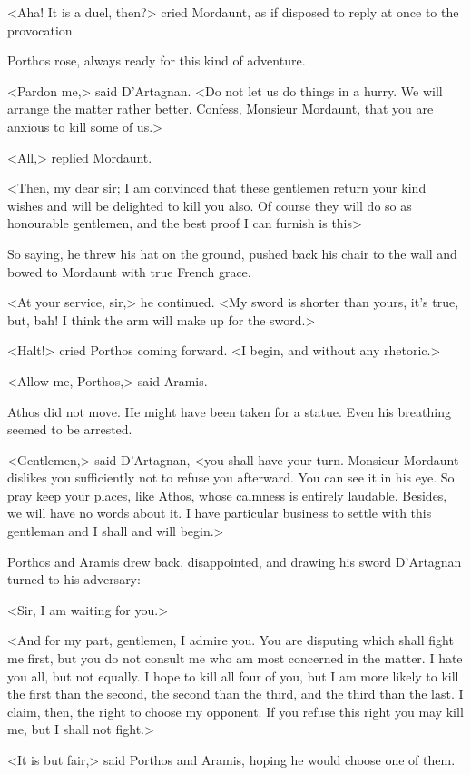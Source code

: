 <Aha! It is a duel, then?> cried Mordaunt, as if disposed to reply at once to the provocation.

Porthos rose, always ready for this kind of adventure.

<Pardon me,> said D'Artagnan. <Do not let us do things in a hurry. We will arrange the matter rather better. Confess, Monsieur Mordaunt, that you are anxious to kill some of us.>

<All,> replied Mordaunt.

<Then, my dear sir; I am convinced that these gentlemen return your kind wishes and will be delighted to kill you also. Of course they will do so as honourable gentlemen, and the best proof I can furnish is this\longdash>

So saying, he threw his hat on the ground, pushed back his chair to the wall and bowed to Mordaunt with true French grace.

<At your service, sir,> he continued. <My sword is shorter than yours, it's true, but, bah! I think the arm will make up for the sword.>

<Halt!> cried Porthos coming forward. <I begin, and without any rhetoric.>

<Allow me, Porthos,> said Aramis.

Athos did not move. He might have been taken for a statue. Even his breathing seemed to be arrested.

<Gentlemen,> said D'Artagnan, <you shall have your turn. Monsieur Mordaunt dislikes you sufficiently not to refuse you afterward. You can see it in his eye. So pray keep your places, like Athos, whose calmness is entirely laudable. Besides, we will have no words about it. I have particular business to settle with this gentleman and I shall and will begin.>

Porthos and Aramis drew back, disappointed, and drawing his sword D'Artagnan turned to his adversary:

<Sir, I am waiting for you.>

<And for my part, gentlemen, I admire you. You are disputing which shall fight me first, but you do not consult me who am most concerned in the matter. I hate you all, but not equally. I hope to kill all four of you, but I am more likely to kill the first than the second, the second than the third, and the third than the last. I claim, then, the right to choose my opponent. If you refuse this right you may kill me, but I shall not fight.>

<It is but fair,> said Porthos and Aramis, hoping he would choose one of them.


